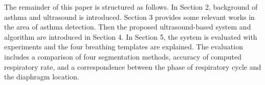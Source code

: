 The remainder of this paper is structured as follows. In Section 2, background of asthma and ultrasound is introduced. Section 3 provides some relevant works in the area of asthma detection. Then the proposed ultrasound-based system and algorithm are introduced in Section 4. In Section 5, the system is evaluated with experiments and the four breathing templates are explained. The evaluation includes a comparison of four segmentation methods, accuracy of computed respiratory rate, and a correspondence between the phase of respiratory cycle and the diaphragm location.
